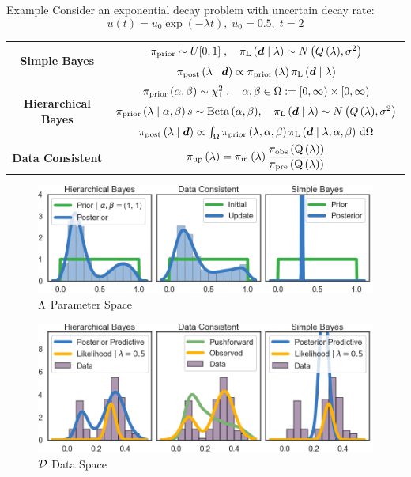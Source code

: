 \begin{block}{Example}
\centering
Consider an exponential decay problem with uncertain decay rate:
\begin{equation*}
       u(t) = u_0\exp(-\lambda t), \; u_0 = 0.5 ,\; t=2
   \end{equation*}

\begin{tabular}{c|c}
\toprule
\multirow{2}{*}{\textbf{Simple Bayes}} & 
$\prior \sim U[0,1]\; , \quad  \likelihood\qGivelam\sim N\left(Q\lam,\sigma^2\right) $ \\
                                        & $\bayes$ \\ 
\midrule
\multirow{3}{*}{\textbf{Hierarchical Bayes}}   &
        $\prior\hyper \sim \chi^2_1\; , \quad \alpha,\beta\in\Omega :=[0,\infty)\times[0,\infty)$ \\
        & $\prior\lamGiveH s\sim \text{Beta}\hyper, \quad \likelihood\qGivelam \sim N\left(Q\lam,\sigma^2\right)$ \\
        & $\Hbayes$ \\
\midrule
\textbf{Data Consistent} &  $\dci$\\
\bottomrule
\end{tabular}
\vspace{1cm}
\begin{figure}
        \includegraphics[width=32cm]{figures/distr_EX_lambda_space.png}
        \vspace{-0.5cm}
        \centering
        \caption{\large $\pspace$ Parameter Space }
\end{figure}
\vspace{-0.5cm}
\begin{figure}
        \includegraphics[width=32cm]{figures/distr_EX_data_space.png}
        \vspace{-0.5cm}
        \centering
        \caption{\large $\dspace$ Data Space  }
\end{figure}



\end{block}
